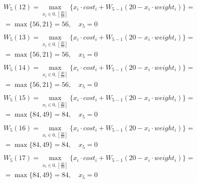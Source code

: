 \documentclass[17pt]{extarticle}
\begin{document}
\[
    \begin{aligned}
         & W_5(12)=\max_{x_i \in \overline{0, \left[\frac{20}{10}\right]}} \{x_i \cdot cost_i + W_{5-1}(20 - x_i \cdot weight_i)\}= \\& = \max \{
        56, 21\}= 56, \quad x_5 = 0                                                                                                 \\
    \end{aligned}
\]
\[
    \begin{aligned}
         & W_5(13)=\max_{x_i \in \overline{0, \left[\frac{20}{10}\right]}} \{x_i \cdot cost_i + W_{5-1}(20 - x_i \cdot weight_i)\}= \\& = \max \{
        56, 21\}= 56, \quad x_5 = 0                                                                                                 \\
    \end{aligned}
\]
\[
    \begin{aligned}
         & W_5(14)=\max_{x_i \in \overline{0, \left[\frac{20}{10}\right]}} \{x_i \cdot cost_i + W_{5-1}(20 - x_i \cdot weight_i)\}= \\& = \max \{
        56, 21\}= 56, \quad x_5 = 0                                                                                                 \\
    \end{aligned}
\]
\[
    \begin{aligned}
         & W_5(15)=\max_{x_i \in \overline{0, \left[\frac{20}{10}\right]}} \{x_i \cdot cost_i + W_{5-1}(20 - x_i \cdot weight_i)\}= \\& = \max \{
        84, 49\}= 84, \quad x_5 = 0                                                                                                 \\
    \end{aligned}
\]
\[
    \begin{aligned}
         & W_5(16)=\max_{x_i \in \overline{0, \left[\frac{20}{10}\right]}} \{x_i \cdot cost_i + W_{5-1}(20 - x_i \cdot weight_i)\}= \\& = \max \{
        84, 49\}= 84, \quad x_5 = 0                                                                                                 \\
    \end{aligned}
\]
\[
    \begin{aligned}
         & W_5(17)=\max_{x_i \in \overline{0, \left[\frac{20}{10}\right]}} \{x_i \cdot cost_i + W_{5-1}(20 - x_i \cdot weight_i)\}= \\& = \max \{
        84, 49\}= 84, \quad x_5 = 0                                                                                                 \\
    \end{aligned}
\]
\end{document}
